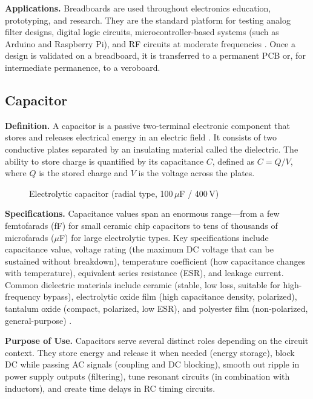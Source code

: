 \documentclass[12pt, a4paper, twoside]{report}
\newcommand{\imgplaceholder}[2]{%
  \begin{figure}[H]
    \centering
    \fcolorbox{gray!60}{gray!12}{%
      \parbox[c][5cm][c]{0.65\textwidth}{%
        \centering
        \textcolor{gray!80}{\Large [Image Placeholder]}\\[6pt]
        \textcolor{gray}{\small Insert figure here}
      }%
    }
    \caption{#1}
    \label{fig:#2}
  \end{figure}
}
\begin{document}
\textbf{Applications.}\quad
Breadboards are used throughout electronics education, prototyping, and research. They
are the standard platform for testing analog filter designs, digital logic circuits,
microcontroller-based systems (such as Arduino and Raspberry Pi), and RF circuits at
moderate frequencies \cite{analog:breadboard}. Once a design is validated on a
breadboard, it is transferred to a permanent PCB or, for intermediate permanence,
to a veroboard.

\subsection{Capacitor}

\textbf{Definition.}\quad
A capacitor is a passive two-terminal electronic component that stores and releases
electrical energy in an electric field \cite{sedra2020}. It consists of two conductive
plates separated by an insulating material called the dielectric. The ability to store
charge is quantified by its capacitance $C$, defined as $C = Q/V$, where $Q$ is the
stored charge and $V$ is the voltage across the plates.

\imgplaceholder{Electrolytic capacitor (radial type, 100\,$\mu$F / 400\,V)}{capacitor}

\textbf{Specifications.}\quad
Capacitance values span an enormous range---from a few femtofarads (fF) for small ceramic
chip capacitors to tens of thousands of microfarads ($\mu$F) for large electrolytic
types. Key specifications include capacitance value, voltage rating (the maximum DC
voltage that can be sustained without breakdown), temperature coefficient (how capacitance
changes with temperature), equivalent series resistance (ESR), and leakage current.
Common dielectric materials include ceramic (stable, low loss, suitable for high-frequency
bypass), electrolytic oxide film (high capacitance density, polarized), tantalum oxide
(compact, polarized, low ESR), and polyester film (non-polarized, general-purpose)
\cite{boylestad2015}.

\textbf{Purpose of Use.}\quad
Capacitors serve several distinct roles depending on the circuit context. They store
energy and release it when needed (energy storage), block DC while passing AC signals
(coupling and DC blocking), smooth out ripple in power supply outputs (filtering),
tune resonant circuits (in combination with inductors), and create time delays in RC
timing circuits.
\end{document}
